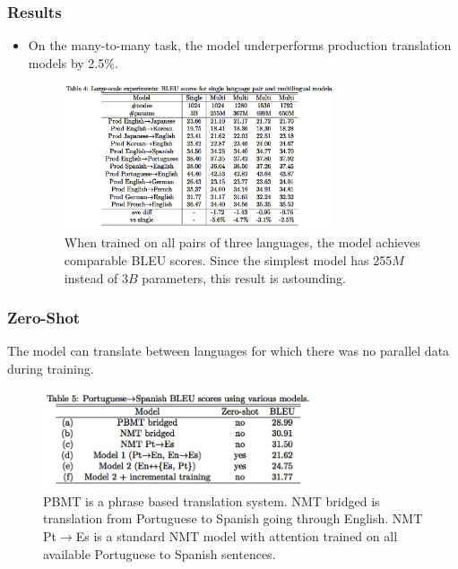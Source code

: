 \documentclass{beamer}
\begin{document}
\begin{frame}
\frametitle{Results}
\begin{itemize}
\item On the many-to-many task, the model underperforms production translation models by 2.5\%.
 \begin{figure}
  \centering
  \includegraphics[width=8cm]{pres_imgs/manyto-many}
  \caption{\label{fig:manyto-many} When trained on all pairs of three languages, the model achieves comparable BLEU scores. Since the simplest model has 255$M$ instead of 3$B$ parameters, this result is astounding.}
\end{figure}

\end{itemize}

\end{frame}

\begin{frame}
\frametitle{Zero-Shot}
The model can translate between languages for which there was no parallel data during training.
 \begin{figure}
  \centering
  \includegraphics[width=8cm]{pres_imgs/zeroshottab}
  \caption{\label{fig:zeroshottab} PBMT is a phrase based translation system. NMT bridged is translation from Portuguese to Spanish going through English. NMT Pt$\rightarrow$Es is a standard NMT model with attention trained on all available Portuguese to Spanish sentences.}
\end{figure}
\end{frame}
\end{document}
